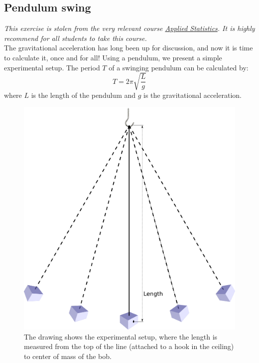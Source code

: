 \documentclass{article}
\begin{document}
\fi
\newpage


\subsection{Pendulum swing}

{
    \em
    This exercise is stolen from the very relevant course \href{http://kurser.ku.dk/course/nfyk13011u/2016-2017}{Applied Statistics}.
    It is highly recommend for all students to take this course.
}\\

The gravitational acceleration has long been up for discussion, and now it is time to calculate it, once and for all!
%
Using a pendulum, we present a simple experimental setup.
The period $T$ of a swinging pendulum can be calculated by:
%
\begin{equation}
T = 2\pi\sqrt{\frac{L}{g}} \label{eq:Pendul_T}
\end{equation}
%
%
where $L$ is the length of the pendulum and $g$ is the gravitational acceleration.\\


\begin{figure}[h]
\includegraphics[scale=0.4]{images/week5_pendulum.png} 
\centering
\caption{The drawing shows the experimental setup, where the length is measured from the top of the line (attached to a hook in the ceiling) to center of mass of the bob.}
\label{fig:pendulum}
\end{figure}
\end{document}
